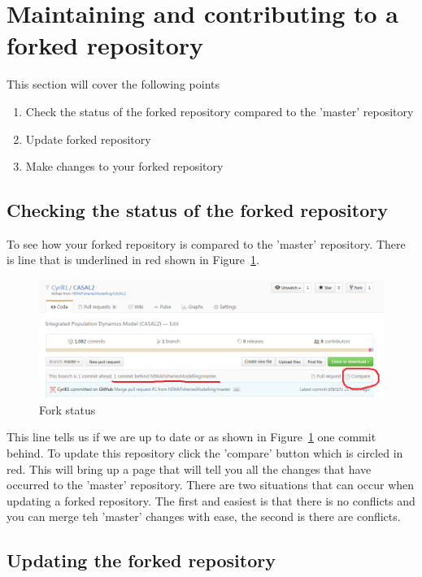 \section{Maintaining and contributing to a forked repository\label{sec:maintain_repo}}
This section will cover the following points
\begin{enumerate}
	\item Check the status of the forked repository compared to the 'master' repository
	\item Update forked repository
	\item Make changes to your forked repository
\end{enumerate}

\subsection{Checking the status of the forked repository}

To see how your forked repository is compared to the 'master' repository. There is line that is underlined in red shown in Figure~\ref{fig:fork_status}.
	
\begin{figure}[!ht]
	\includegraphics[scale=0.6]{Figures/fork_status.png}
	\caption{Fork status}\label{fig:fork_status}
\end{figure}

This line tells us if we are up to date or as shown in Figure~\ref{fig:fork_status} one commit behind. To update this repository click the 'compare' button which is circled in red. This will bring up a page that will tell you all the changes that have occurred to the 'master' repository. There are two situations that can occur when updating a forked repository. The first and easiest is that there is no conflicts and you can merge teh 'master' changes with ease, the second is there are conflicts.


\subsection{Updating the forked repository}